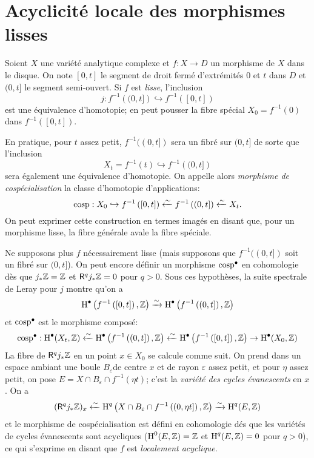 \documentclass[oneside]{book}
\begin{document}
\section{Acyclicité locale des morphismes lisses}\label{I:5}

Soient $X$ une variété analytique complexe et $f:X\to D$ un morphisme de 
$X$ dans le disque. On note $[0,t]$ le segment de droit fermé d'extrémités 
$0$ et $t$ dans $D$ et $(0,t]$ le segment semi-ouvert. Si $f$ est \emph{lisse}, 
l'inclusion 
\[
  j : f^{-1}\left((0,t]\right) \hookrightarrow f^{-1}\left([0,t]\right)
\]
est une équivalence d'homotopie; en peut pousser la fibre spécial 
$X_0=f^{-1}(0)$ dans $f^{-1}([0,t])$. 

En pratique, pour $t$ assez petit, $f^{-1}((0,t])$ sera un fibré sur 
$(0,t]$ de sorte que l'inclusion 
\[
  X_t = f^{-1}(t) \hookrightarrow f^{-1}\left((0,t]\right)
\]
sera également une équivalence d'homotopie. On appelle alors \emph{morphisme 
de cospécialisation} la classe d'homotopie d'applications: 
\[
  \operatorname{cosp} : X_0 \hookrightarrow f^{-1}\left([0,t]\right) \xleftarrow\sim f^{-1}\left((0,t]\right) \xleftarrow\sim X_t \text{.}
\]
On peut exprimer cette construction en termes imagés en disant que, pour un 
morphisme lisse, la fibre générale avale la fibre spéciale. 

Ne supposons plus $f$ nécessairement lisse (mais supposons que $f^{-1}((0,t])$ 
soit un fibré sur $(0,t]$). On peut encore définir un morphisme 
$\operatorname{cosp}^\bullet$ en cohomologie dès que $j_* \mathbb{Z}=\mathbb{Z}$ et 
$\mathsf{R}^q j_* \mathbb{Z} = 0$ pour $q>0$. Sous ces hypothèses, la suite spectrale de 
Leray pour $j$ montre qu'on a 
\[
  \operatorname{H}^\bullet\left(f^{-1}\left([0,t]\right),\mathbb{Z}\right) \xrightarrow\sim \operatorname{H}^\bullet\left(f^{-1}\left((0,t]\right),\mathbb{Z}\right)
\]
et $\operatorname{cosp}^\bullet$ est le morphisme composé: 
\[
  \operatorname{cosp}^\bullet : \operatorname{H}^\bullet(X_t,\mathbb{Z})
    \xleftarrow\sim \operatorname{H}^\bullet\left(f^{-1}\left((0,t]\right),\mathbb{Z}\right) 
    \xleftarrow\sim \operatorname{H}^\bullet\left(f^{-1}\left([0,t]\right),\mathbb{Z}\right) 
    \to \operatorname{H}^\bullet(X_0,\mathbb{Z})
\]
La fibre de $\mathsf{R}^q j_* \mathbb{Z}$ en un point $x\in X_0$ se calcule comme suit. On 
prend dans un espace ambiant une boule $B_\varepsilon$de centre $x$ et de rayon 
$\varepsilon$ assez petit, et pour $\eta$ assez petit, on pose 
$E=X\cap B_\varepsilon \cap f^{-1}(\eta t)$; c'est la \emph{variété des 
cycles évanescents} en $x$. On a 
\[
  (\mathsf{R}^q j_* \mathbb{Z})_x \xleftarrow\sim \operatorname{H}^q\left(X\cap B_\varepsilon\cap f^{-1}\left((0,\eta t]\right),\mathbb{Z}\right) \xrightarrow\sim \operatorname{H}^q(E,\mathbb{Z})
\]
et le morphisme de cospécialisation est défini en cohomologie dés que les 
variétés de cycles évanescents sont acycliques ($\operatorname{H}^0(E,\mathbb{Z})=\mathbb{Z}$ et 
$\operatorname{H}^q(E,\mathbb{Z}) = 0$ pour $q>0$), ce qui s'exprime en disant que $f$ est 
\emph{localement acyclique}. 
\end{document}
